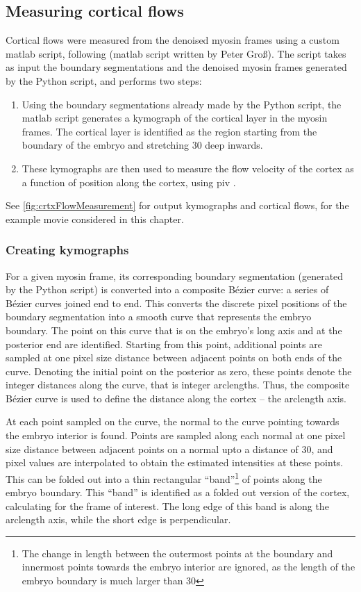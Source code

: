 \subsection{Measuring cortical flows}\label{subsec:corticalFlows}
Cortical flows were measured from the denoised myosin frames using a custom \ac{matlab} script, following \cite{gross2019guiding} (\ac{matlab} script written by Peter Gro{\ss}). The script takes as input the boundary segmentations and the denoised myosin frames generated by the Python script, and performs two steps:
\begin{enumerate}
    \item Using the boundary segmentations already made by the Python script, the \ac{matlab} script generates a kymograph of the cortical layer in the myosin frames. The cortical layer is identified as the region starting from the boundary of the embryo and stretching \SI{30}{\pixels} deep inwards.
    \item These kymographs are then used to measure the flow velocity of the cortex as a function of position along the cortex, using \ac{piv} \citep{thielicke2014pivlab}.
\end{enumerate}
See \autoref{fig:crtxFlowMeasurement} for output kymographs and cortical flows, for the example movie considered in this chapter.

\subsubsection{Creating kymographs}\label{subsubsec:kymographs}
For a given myosin frame, its corresponding boundary segmentation (generated by the Python script) is converted into a composite B{\'e}zier curve: a series of B{\'e}zier curves joined end to end. This converts the discrete pixel positions of the boundary segmentation into a smooth curve that represents the embryo boundary. The point on this curve that is on the embryo's long axis and at the posterior end are identified. Starting from this point, additional points are sampled at one pixel size distance between adjacent points on both ends of the curve. Denoting the initial point on the posterior as zero, these points denote the integer distances along the curve, that is integer arclengths. Thus, the composite B{\'e}zier curve is used to define the distance along the cortex -- the arclength axis. 

At each point sampled on the curve, the normal to the curve pointing towards the embryo interior is found. Points are sampled along each normal at one pixel size distance between adjacent points on a normal upto a distance of \SI{30}{\pixels}, and pixel values are interpolated to obtain the estimated intensities at these points. This can be folded out into a thin rectangular \enquote{band}\footnote{The change in length between the outermost points at the boundary and innermost points towards the embryo interior are ignored, as the length of the embryo boundary is much larger than \SI{30}{\pixels}} of points along the embryo boundary. This \enquote{band} is identified as a folded out version of the cortex, calculating for the frame of interest. The long edge of this band is along the arclength axis, while the short edge is perpendicular. 

